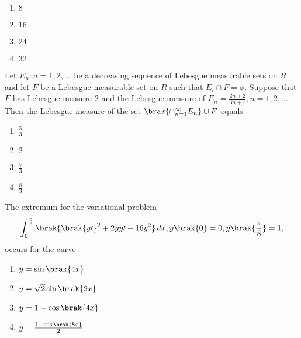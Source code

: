     \begin{enumerate}
        \item $8$
        \item $16$
        \item $24$
        \item $32$
    \end{enumerate}
    \item Let $E_n\colon n=1,2,\dots$ be a decreasing sequence of Lebesgue measurable sets on $R$ and let $F$ be a Lebesgue measurable set on $R$ such that $E_i\cap F=\phi$. Suppose that $F$ has Lebesgue measure $2$ and the Lebesgue measure of $E_n=\frac{2n+2}{3n+1},n=1,2,\dots$.\\
    Then the Lebesgue measure of the set $\brak{\cap_{n=1}^{\infty} E_n}\cup F$ equals
    \begin{enumerate}
        \item $\frac{5}{3}$
        \item $2$
        \item $\frac{7}{3}$
        \item $\frac{8}{3}$
    \end{enumerate}
    \item The extremum for the variational problem
    $$\int_{0}^{\frac{\pi}{8}}\brak{\brak{y\prime}^2+2yy\prime-16y^2}\, dx, y\brak{0}=0,y\brak{\frac{\pi}{8}}=1,$$
    occurs for the curve 
    \begin{enumerate}
        \item $y=\sin\brak{4x}$
        \item $y=\sqrt{2}\sin\brak{2x}$
        \item $y=1-\cos\brak{4x}$
        \item $y=\frac{1-\cos\brak{8x}}{2}$
    \end{enumerate}
